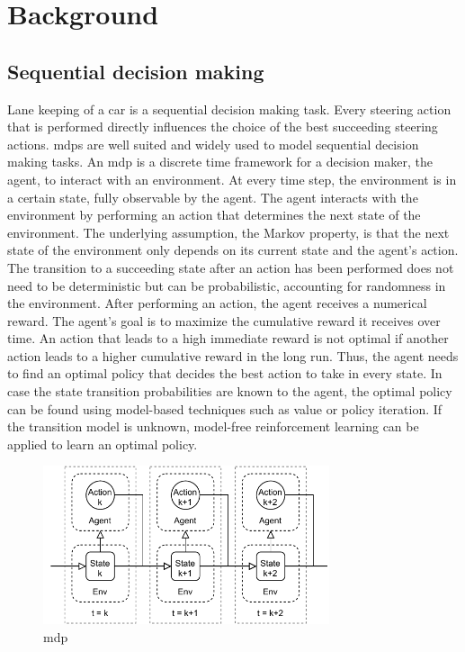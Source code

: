 \chapter{Background}
\label{sec:theory}

\section{Sequential decision making}

Lane keeping of a car is a sequential decision making task. Every steering action that is performed directly influences the choice of the best succeeding steering actions. \Glspl{mdp} are well suited and widely used to model sequential decision making tasks. An \gls{mdp} is a discrete time framework for a decision maker, the agent, to interact with an environment. At every time step, the environment is in a certain state, fully observable by the agent. The agent interacts with the environment by performing an action that determines the next state of the environment. The underlying assumption, the Markov property, is that the next state of the environment only depends on its current state and the agent's action. The transition to a succeeding state after an action has been performed does not need to be deterministic but can be probabilistic, accounting for randomness in the environment. After performing an action, the agent receives a numerical reward. The agent's goal is to maximize the cumulative reward it receives over time. An action that leads to a high immediate reward is not optimal if another action leads to a higher cumulative reward in the long run. Thus, the agent needs to find an optimal policy that decides the best action to take in every state. In case the state transition probabilities are known to the agent, the optimal policy can be found using model-based techniques such as value or policy iteration. If the transition model is unknown, model-free reinforcement learning can be applied to learn an optimal policy.

\begin{figure}[htbp]
    \centering
    \includegraphics[width=0.75\textwidth]{figures/MDP.pdf}
    \caption{\acrfull{mdp}}
\end{figure}

